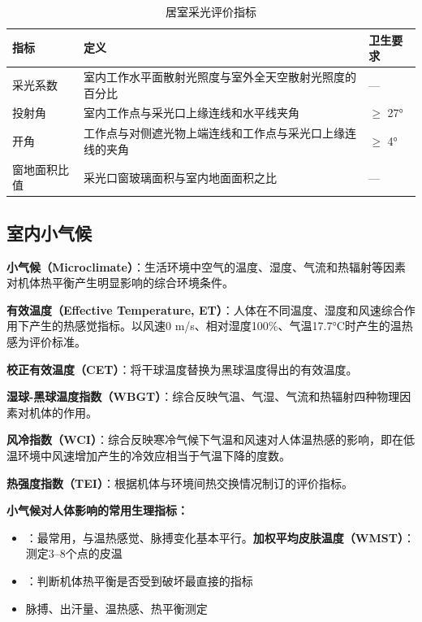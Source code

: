 \documentclass[10pt,a4paper,oneside]{ctexbook}
\begin{document}
\begin{table}[htbp]
\centering
\caption{居室采光评价指标}
\begin{tabularx}{\textwidth}{lXl}
\hline
\textbf{指标} & \textbf{定义} & \textbf{卫生要求} \\
\hline
采光系数 & 室内工作水平面散射光照度与室外全天空散射光照度的百分比 & — \\
投射角 & 室内工作点与采光口上缘连线和水平线夹角 & $\geq$ 27° \\
开角 & 工作点与对侧遮光物上端连线和工作点与采光口上缘连线的夹角 & $\geq$ 4° \\
窗地面积比值 & 采光口窗玻璃面积与室内地面面积之比 & — \\
\hline
\end{tabularx}
\end{table}

\subsection{室内小气候}

\begin{defbox}
\textbf{小气候（Microclimate）}：生活环境中空气的温度、湿度、气流和热辐射等因素对机体热平衡产生明显影响的综合环境条件。
\end{defbox}

\begin{defbox}
\textbf{有效温度（Effective Temperature, ET）}：人体在不同温度、湿度和风速综合作用下产生的热感觉指标。以风速0 m/s、相对湿度100\%、气温17.7°C时产生的温热感为评价标准。

\textbf{校正有效温度（CET）}：将干球温度替换为黑球温度得出的有效温度。

\textbf{湿球-黑球温度指数（WBGT）}：综合反映气温、气湿、气流和热辐射四种物理因素对机体的作用。

\textbf{风冷指数（WCI）}：综合反映寒冷气候下气温和风速对人体温热感的影响，即在低温环境中风速增加产生的冷效应相当于气温下降的度数。

\textbf{热强度指数（TEI）}：根据机体与环境间热交换情况制订的评价指标。
\end{defbox}

\textbf{小气候对人体影响的常用生理指标：}
\begin{itemize}[leftmargin=*]
    \item {}：最常用，与温热感觉、脉搏变化基本平行。\textbf{加权平均皮肤温度（WMST）}：测定3--8个点的皮温
    \item {}：判断机体热平衡是否受到破坏最直接的指标
    \item 脉搏、出汗量、温热感、热平衡测定
\end{itemize}
\end{document}
